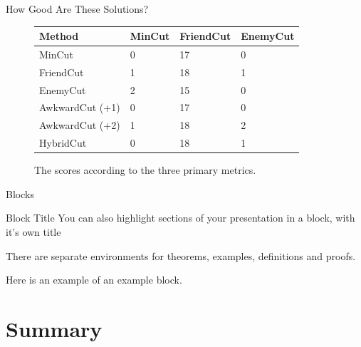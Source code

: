 \documentclass{beamer}
\begin{document}
\begin{frame}{}
    \begin{block}{How Good Are These Solutions?}
\begin{figure}[h]
    \centering
    \begin{tabular}{ |l|l|l|l| }
        \hline
        \textbf{Method} & \textbf{MinCut} & \textbf{FriendCut} & \textbf{EnemyCut} \\
        \hline
        MinCut & 0 & 17 & 0 \\
        FriendCut & 1 & 18 & 1 \\
        EnemyCut & 2 & 15 & 0 \\
        AwkwardCut (+1) & 0 & 17 & 0 \\
        AwkwardCut (+2) & 1 & 18 & 2 \\
        HybridCut & 0 & 18 & 1 \\
        \hline
    \end{tabular}
    \caption{The scores according to the three primary metrics.}
\end{figure}
    \end{block}
\end{frame}

\begin{frame}{Blocks}
\begin{block}{Block Title}
You can also highlight sections of your presentation in a block, with it's own title
\end{block}
\begin{theorem}
There are separate environments for theorems, examples, definitions and proofs.
\end{theorem}
\begin{example}
Here is an example of an example block.
\end{example}
\end{frame}

\section*{Summary}
\end{document}

